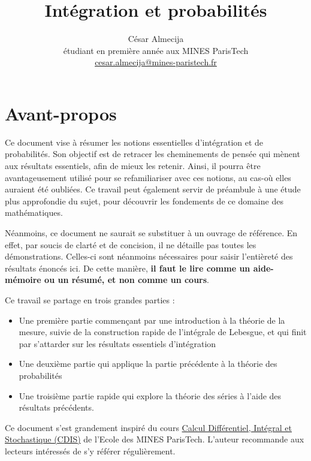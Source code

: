\documentclass[french]{report}
\theoremstyle{plain}
\theoremstyle{definition}
\theoremstyle{remark}
\newcommand\itemb{\item[$\bullet$]}
\begin{document}
\title{Intégration et probabilités}
\author{César Almecija
\\ étudiant en première année aux MINES ParisTech
\\ \href{mailto:cesar.almecija@mines-paristech.fr}{cesar.almecija@mines-paristech.fr}}

\maketitle

\tableofcontents

\chapter*{Avant-propos}
Ce document vise à résumer les notions essentielles d'intégration et de probabilités.
Son objectif est de retracer les cheminements de pensée qui mènent aux résultats essentiels, afin de mieux les retenir.
Ainsi, il pourra être avantageusement utilisé pour se refamiliariser avec ces notions, au cas-où elles auraient été oubliées.
Ce travail peut également servir de préambule à une étude plus approfondie du sujet, pour découvrir les fondements de ce domaine des mathématiques.

Néanmoins, ce document ne saurait se substituer à un ouvrage de référence. En effet, par soucis de clarté et de concision, il ne détaille pas toutes les démonstrations.
Celles-ci sont néanmoins nécessaires pour saisir l'entièreté des résultats énoncés ici. De cette manière, \textbf{il faut le lire comme un aide-mémoire ou un résumé, et non comme un cours}.

\bigskip

Ce travail se partage en trois grandes parties :
\begin{itemize}
  \itemb Une première partie commençant par une introduction à la théorie de la mesure, suivie de la construction rapide de l'intégrale de Lebesgue, et qui finit par s'attarder sur les résultats essentiels d'intégration
  \itemb Une deuxième partie qui applique la partie précédente à la théorie des probabilités
  \itemb Une troisième partie rapide qui explore la théorie des séries à l'aide des résultats précédents.
\end{itemize}

\bigskip

Ce document s'est grandement inspiré du cours \href{https://github.com/boisgera/CDIS}{Calcul Différentiel, Intégral et Stochastique (CDIS)} de l'Ecole des MINES ParisTech.
L'auteur recommande aux lecteurs intéressés de s'y référer régulièrement.
\end{document}
